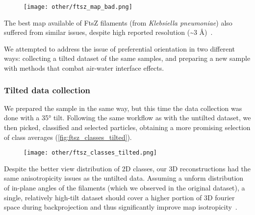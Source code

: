 \begin{figure}[ht]
    \centering
    \texttt{[image: other/ftsz\_map\_bad.png]}
    \label{fig:ftsz_map_bad}
\end{figure}

The best map available of FtsZ filaments (from \textit{Klebsiella pneumoniae}) also suffered from similar issues, despite high reported resolution (\sim3 Å)~\cite{fujitaStructuresFtsZSingle2023}.

We attempted to address the issue of preferential orientation in two different ways: collecting a tilted dataset of the same samples, and preparing a new sample with methods that combat air-water interface effects.

\subsubsection{Tilted data collection}\label{ftsz_tilted}

We prepared the sample in the same way, but this time the data collection was done with a 35° tilt.
Following the same workflow as with the untilted dataset, we then picked, classified and selected particles, obtaining a more promising selection of class averages (\autoref{fig:ftsz_classes_tilted}).

\begin{figure}[ht]
    \centering
    \texttt{[image: other/ftsz\_classes\_tilted.png]}
    \label{fig:ftsz_classes_tilted}
\end{figure}

Despite the better view distribution of 2D classes, our 3D reconstructions had the same anisotropicity issues as the untilted data.
Assuming a unform distribution of in-plane angles of the filaments (which we observed in the original dataset), a single, relatively high-tilt dataset should cover a higher portion of 3D fourier space during backprojection and thus significantly improve map isotropicity~\cite{tanAddressingPreferredSpecimen2017}.

